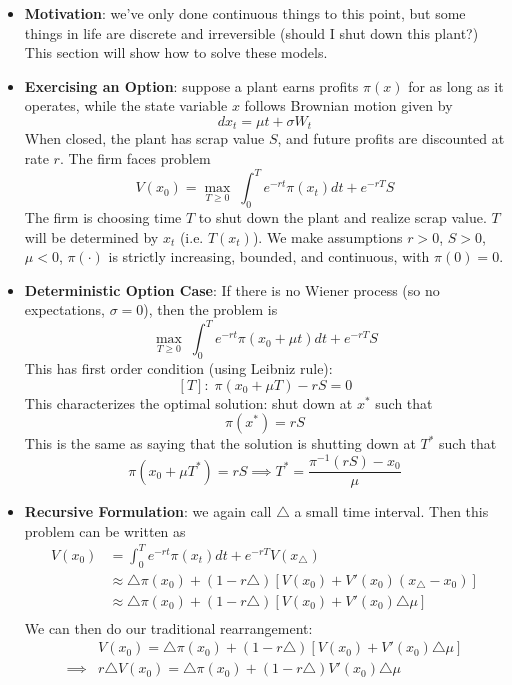 \documentclass[12pt]{article}
\begin{document}
\begin{itemize}
    \item \textbf{Motivation}: we've only done continuous things to this point, but some things in life are discrete and irreversible (should I shut down this plant?) This section will show how to solve these models.
    \item \textbf{Exercising an Option}: suppose a plant earns profits $\pi(x)$ for as long as it operates, while the state variable $x$ follows Brownian motion given by
    \[dx_t = \mu t + \sigma W_t\]
    When closed, the plant has scrap value $S$, and future profits are discounted at rate $r$. The firm faces problem
    \[V(x_0) = \max_{T\geq 0}\; \int_0^Te^{-rt}\pi(x_t)dt + e^{-rT}S\]
    The firm is choosing time $T$ to shut down the plant and realize scrap value. $T$ will be determined by $x_t$ (i.e. $T(x_t)$). We make assumptions $r>0$, $S>0$, $\mu < 0$, $\pi(\cdot)$ is strictly increasing, bounded, and continuous, with $\pi(0) = 0$. 
    \item \textbf{Deterministic Option Case}: If there is no Wiener process (so no expectations, $\sigma =0$), then the problem is
    \[\max_{T\geq 0}\; \int_0^Te^{-rt}\pi(x_0 + \mu t)dt + e^{-rT}S\]
    This has first order condition (using Leibniz rule):
    \[[T]:\; \pi(x_0 + \mu T) -rS = 0\]
    This characterizes the optimal solution: shut down at $x^*$ such that
    \[\pi(x^*) = rS\]
    This is the same as saying that the solution is shutting down at $T^*$ such that
    \[\pi(x_0 + \mu T^*) = rS \implies T^* = \frac{\pi^{-1}(rS) - x_0}{\mu}\]
    \item \textbf{Recursive Formulation}: we again call $\triangle$ a small time interval. Then this problem can be written as
    \[\begin{split}
        V(x_0) &= \int_0^Te^{-rt}\pi(x_t)dt + e^{-rT}V(x_{\triangle}) \\
        &\approx \triangle \pi(x_0) + (1-r\triangle)[V(x_0)+ V'(x_0)(x_{\triangle}-x_0)] \\
        &\approx \triangle \pi(x_0) + (1-r\triangle)[V(x_0)+ V'(x_0)\triangle \mu] \\
    \end{split}\]
    We can then do our traditional rearrangement:
    \[\begin{split}
        &V(x_0) = \triangle \pi(x_0) + (1-r\triangle)[V(x_0)+ V'(x_0)\triangle \mu] \\
        \implies &r\triangle V(x_0) = \triangle \pi(x_0) + (1-r\triangle)V'(x_0)\triangle \mu\\

\end{split}\]
\end{itemize}
\end{document}
